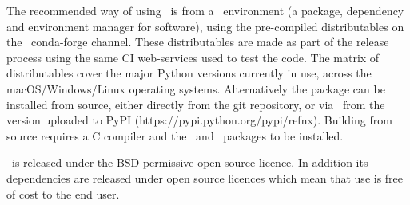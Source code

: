 \documentclass[12pt]{article}
\begin{document}
 The recommended way of using \ is from a \conda\ environment (a package, dependency and environment manager for software), using the pre-compiled distributables on the \ conda-forge channel. These distributables are made as part of the release process using the same CI web-services used to test the code. The matrix of distributables cover the major Python versions currently in use, across the macOS/Windows/Linux operating systems. Alternatively the package can be installed from source, either directly from the git repository, or via \pip\ from the version uploaded to PyPI (https://pypi.python.org/pypi/refnx). Building from source requires a C compiler and the \Cython\ and \NumPy\ packages to be installed.
  
\ is released under the BSD permissive open source licence. In addition its dependencies are released under open source licences which mean that use is free of cost to the end user.
\end{document}
